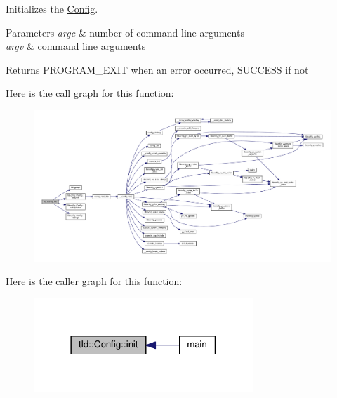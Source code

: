 Initializes the \hyperlink{classtld_1_1Config}{Config}. 


\begin{DoxyParams}{Parameters}
{\em argc} & number of command line arguments \\
\hline
{\em argv} & command line arguments \\
\hline
\end{DoxyParams}
\begin{DoxyReturn}{Returns}
P\-R\-O\-G\-R\-A\-M\-\_\-\-E\-X\-I\-T when an error occurred, S\-U\-C\-C\-E\-S\-S if not 
\end{DoxyReturn}


Here is the call graph for this function\-:\nopagebreak
\begin{figure}[H]
\begin{center}
\leavevmode
\includegraphics[width=350pt]{classtld_1_1Config_ab2f2fb863b08832e2b877e6f09073333_cgraph}
\end{center}
\end{figure}




Here is the caller graph for this function\-:\nopagebreak
\begin{figure}[H]
\begin{center}
\leavevmode
\includegraphics[width=234pt]{classtld_1_1Config_ab2f2fb863b08832e2b877e6f09073333_icgraph}
\end{center}
\end{figure}




